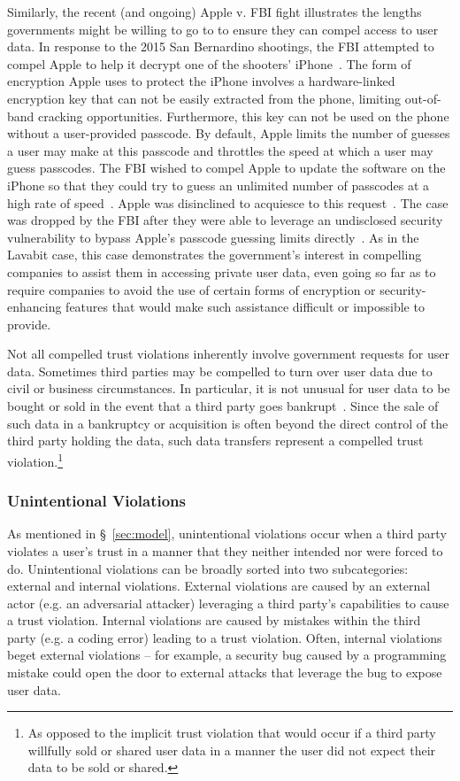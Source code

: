 Similarly, the recent (and ongoing) Apple v. FBI fight illustrates the
lengths governments might be willing to go to to ensure they can
compel access to user data.  In response to the 2015 San Bernardino
shootings, the FBI attempted to compel Apple to help it decrypt one of
the shooters' iPhone~\cite{ars-cookvfbi}. The form of encryption Apple
uses to protect the iPhone involves a hardware-linked encryption key
that can not be easily extracted from the phone, limiting out-of-band
cracking opportunities. Furthermore, this key can not be used on the
phone without a user-provided passcode. By default, Apple limits the
number of guesses a user may make at this passcode and throttles the
speed at which a user may guess passcodes. The FBI wished to compel
Apple to update the software on the iPhone so that they could try to
guess an unlimited number of passcodes at a high rate of
speed~\cite{eff-applecrypto}. Apple was disinclined to acquiesce to
this request~\cite{apple-fbiletter}. The case was dropped by the FBI
after they were able to leverage an undisclosed security vulnerability
to bypass Apple's passcode guessing limits
directly~\cite{ars-fbi-breakthrough, ars-fbi-greyhats}. As in the
Lavabit case, this case demonstrates the government's interest in
compelling companies to assist them in accessing private user data,
even going so far as to require companies to avoid the use of certain
forms of encryption or security-enhancing features that would make
such assistance difficult or impossible to provide.

Not all compelled trust violations inherently involve government
requests for user data. Sometimes third parties may be compelled to
turn over user data due to civil or business circumstances. In
particular, it is not unusual for user data to be bought or sold in
the event that a third party goes bankrupt~\cite{nguyen2004,
  singer2015, solove2015}. Since the sale of such data in a bankruptcy
or acquisition is often beyond the direct control of the third party
holding the data, such data transfers represent a compelled trust
violation.\footnote{As opposed to the implicit trust violation that
  would occur if a third party willfully sold or shared user data in a
  manner the user did not expect their data to be sold or shared.}

\subsubsection{Unintentional Violations}

As mentioned in \S~\ref{sec:model}, unintentional violations occur
when a third party violates a user's trust in a manner that they
neither intended nor were forced to do. Unintentional violations can
be broadly sorted into two subcategories: external and internal
violations. External violations are caused by an external actor
(e.g. an adversarial attacker) leveraging a third party's capabilities
to cause a trust violation. Internal violations are caused by mistakes
within the third party (e.g. a coding error) leading to a trust
violation. Often, internal violations beget external violations -- for
example, a security bug caused by a programming mistake could open the
door to external attacks that leverage the bug to expose user data.

